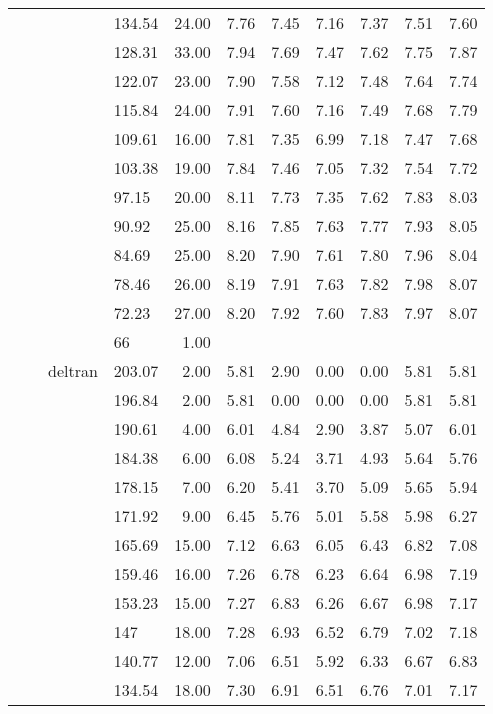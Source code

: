 \begin{longtable}{llllrrrrrrr}
   &  &  & 134.54 & 24.00 & 7.76 & 7.45 & 7.16 & 7.37 & 7.51 & 7.60 \\ 
   &  &  & 128.31 & 33.00 & 7.94 & 7.69 & 7.47 & 7.62 & 7.75 & 7.87 \\ 
   &  &  & 122.07 & 23.00 & 7.90 & 7.58 & 7.12 & 7.48 & 7.64 & 7.74 \\ 
   &  &  & 115.84 & 24.00 & 7.91 & 7.60 & 7.16 & 7.49 & 7.68 & 7.79 \\ 
   &  &  & 109.61 & 16.00 & 7.81 & 7.35 & 6.99 & 7.18 & 7.47 & 7.68 \\ 
   &  &  & 103.38 & 19.00 & 7.84 & 7.46 & 7.05 & 7.32 & 7.54 & 7.72 \\ 
   &  &  & 97.15 & 20.00 & 8.11 & 7.73 & 7.35 & 7.62 & 7.83 & 8.03 \\ 
   &  &  & 90.92 & 25.00 & 8.16 & 7.85 & 7.63 & 7.77 & 7.93 & 8.05 \\ 
   &  &  & 84.69 & 25.00 & 8.20 & 7.90 & 7.61 & 7.80 & 7.96 & 8.04 \\ 
   &  &  & 78.46 & 26.00 & 8.19 & 7.91 & 7.63 & 7.82 & 7.98 & 8.07 \\ 
   &  &  & 72.23 & 27.00 & 8.20 & 7.92 & 7.60 & 7.83 & 7.97 & 8.07 \\ 
   &  &  & 66 & 1.00 &  &  &  &  &  &  \\ 
   &  & deltran & 203.07 & 2.00 & 5.81 & 2.90 & 0.00 & 0.00 & 5.81 & 5.81 \\ 
   &  &  & 196.84 & 2.00 & 5.81 & 0.00 & 0.00 & 0.00 & 5.81 & 5.81 \\ 
   &  &  & 190.61 & 4.00 & 6.01 & 4.84 & 2.90 & 3.87 & 5.07 & 6.01 \\ 
   &  &  & 184.38 & 6.00 & 6.08 & 5.24 & 3.71 & 4.93 & 5.64 & 5.76 \\ 
   &  &  & 178.15 & 7.00 & 6.20 & 5.41 & 3.70 & 5.09 & 5.65 & 5.94 \\ 
   &  &  & 171.92 & 9.00 & 6.45 & 5.76 & 5.01 & 5.58 & 5.98 & 6.27 \\ 
   &  &  & 165.69 & 15.00 & 7.12 & 6.63 & 6.05 & 6.43 & 6.82 & 7.08 \\ 
   &  &  & 159.46 & 16.00 & 7.26 & 6.78 & 6.23 & 6.64 & 6.98 & 7.19 \\ 
   &  &  & 153.23 & 15.00 & 7.27 & 6.83 & 6.26 & 6.67 & 6.98 & 7.17 \\ 
   &  &  & 147 & 18.00 & 7.28 & 6.93 & 6.52 & 6.79 & 7.02 & 7.18 \\ 
   &  &  & 140.77 & 12.00 & 7.06 & 6.51 & 5.92 & 6.33 & 6.67 & 6.83 \\ 
   &  &  & 134.54 & 18.00 & 7.30 & 6.91 & 6.51 & 6.76 & 7.01 & 7.17 \\ 

\end{longtable}
